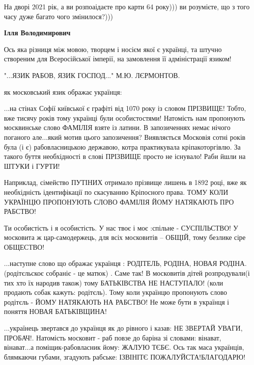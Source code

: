 \begin{itemize}
\begin{itemize}
 

На дворі 2021 рік, а ви розпоаідаєте про карти 64 року))) ви розумієте, що з
того часу дуже багато чого змінилося?)))


 
\textbf{Ілля Володимирович} 

Ось яка різниця між мовою, творцем і носієм якої є українці, та штучно
створеним для Всеросійської імперії, на замовлення її адміністрації язиком!

"...ЯЗИК РАБОВ, ЯЗИК ГОСПОД..." М.Ю. ЛЄРМОНТОВ.

як московський язик ображає українця:

...на стінах Софії київської є графіті від 1070 року із словом ПРІЗВИЩЕ! Тобто,
вже тисячу років тому українці були особистостями! Натомість нам пропонують
москвинське слово ФАМІЛІЯ взяте із латини. В запозиченнях немає нічого поганого
але...який мотив цього запозичення? Виявляється Московія сотні років була (і є)
рабовласницькою державою, котра практикувала кріпакоторгівлю. За такого буття
необхідності в слові ПРІЗВИЩЕ просто не існувало! Раби йшли на ШТУКИ і ГУРТИ!

Наприклад, сімейство ПУТІНИХ отримало прізвище лишень в 1892 році, вже як
необхідність ідентифікації по скасуванню Кріпосного права. ТОМУ КОЛИ УКРАЇНЦЮ
ПРОПОНУЮТЬ СЛОВО ФАМІЛІЯ ЙОМУ НАТЯКАЮТЬ ПРО РАБСТВО!

Ти особистість і я особистість. У нас твоє і моє :спільне - СУСПІЛЬСТВО! У
московита ж цар-самодержець, для всіх московитів – ОБЩІЙ, тому безлике сіре
ОБЩЕСТВО!

...наступне слово що ображає українця : РОДІТЕЛЬ, РОДІНА, НОВАЯ
РОДІНА.(родітєльскоє собраніє - це матюк) . Саме так! В московитів дітей
розпродували(і тих хто їх народив також) тому БАТЬКІВСТВА НЕ НАСТУПАЛО! (коли
продають собак кажуть: родітєль). Тому коли українцю пропонують слово родітєль
- ЙОМУ НАТЯКАЮТЬ НА РАБСТВО! Не може бути в українця і поняття НОВАЯ
БАТЬКІВЩИНА!

...українець звертався до українця як до рівного і казав: НЕ ЗВЕРТАЙ УВАГИ,
ПРОБАЧ!. Натомість московит - раб повзе до баріна зі словами: вінават,
вінават...а поміщик-рабовласник йому: ЖАЛУЮ ТЄБЄ. Ось так маса українців,
блямкаючи губами, згадують рабське: ІЗВІНІТЄ ПОЖАЛУЙСТА!БЛАГОДАРЮ!


\end{itemize}
\end{itemize}
